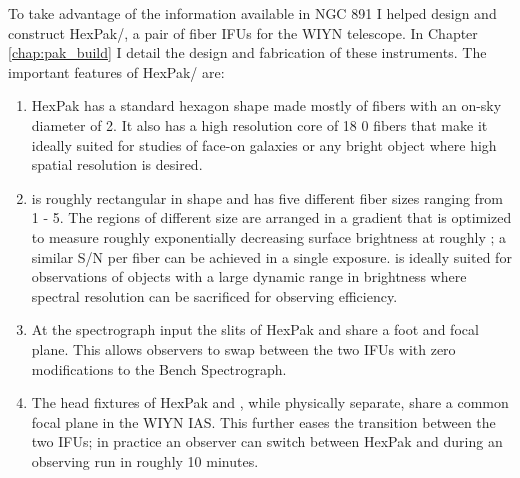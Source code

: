 To take advantage of the information available in NGC 891 I helped
design and construct HexPak/\GP, a pair of fiber IFUs for the WIYN
telescope. In Chapter \ref{chap:pak_build} I detail the design and
fabrication of these instruments. The important features of HexPak/\GP
are:
\begin{enumerate}
\item HexPak has a standard hexagon shape made mostly of fibers with
  an on-sky diameter of 2. It also has a high resolution core
  of 18 0 fibers that make it ideally suited for studies of
  face-on galaxies or any bright object where high spatial resolution
  is desired.

\item \GP is roughly rectangular in shape and has five different fiber
  sizes ranging from 1 - 5. The regions of different
  size are arranged in a gradient that is optimized to measure roughly
  exponentially decreasing surface brightness at roughly
  ; a similar S/N per fiber can be achieved in a single
  exposure. \GP is ideally suited for observations of objects with a
  large dynamic range in brightness where spectral resolution can be
  sacrificed for observing efficiency.

\item At the spectrograph input the slits of HexPak and \GP share a
  foot and focal plane. This allows observers to swap between the two
  IFUs with zero modifications to the Bench Spectrograph.

\item The head fixtures of HexPak and \GP, while physically separate,
  share a common focal plane in the WIYN IAS. This further eases the
  transition between the two IFUs; in practice an observer can switch
  between HexPak and \GP during an observing run in roughly 10
  minutes.

\end{enumerate}

